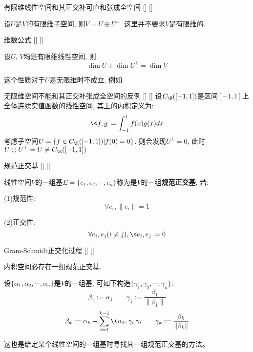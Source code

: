\documentclass[UTF8]{ctexart}
\begin{document}
		

        \begin{ppt}
            []
            {有限维线性空间和其正交补可直和张成全空间}
            []
            []
            
            设$U$是$V$的有限维子空间, 则$V=U\oplus U^{\perp}$. 这里并不要求$V$是有限维的.
        \end{ppt}
        
        \begin{ppt}
			[]
			{维数公式}
			[]
			[]
			
			设$U$, $V$均是有限维线性空间, 则
            \[\dim U+\dim U^{\perp}=\dim V\]
		\end{ppt}

        这个性质对于$U$是无限维时不成立, 例如
        \begin{cxmp}
            []
            {无限维空间不能和其正交补张成全空间的反例}
            []
            []
            设$C_{\R}([-1,1])$是区间$[-1,1]$上全体连续实值函数的线性空间, 
            其上的内积定义为:
            \[\<f,g\>=\int_{-1}^{1}f(x)g(x)dx\]
            考虑子空间$U=\{f\in C_{\R}([-1,1])| f(0)=0\}$. 则会发现$U^{\perp}={0}$, 此时$U\oplus U^{\perp}=U\neq C_{\R}([-1,1])$
        \end{cxmp}
        
		\begin{dfn}
			[]
			{规范正交基}
			[]
			[]

			线性空间$V$的一组基$E=\{e_1,e_2,\cdots,e_n\}$称为是$V$的一组\textbf{规范正交基}, 若: 

			(1)规范性: 
			\[\forall e_i, \|e_i\|=1\]

			(2)正交性: 
			\[\forall e_i,e_j(i\neq j), \<e_i,e_j\>=0\]
		\end{dfn}
		
		\begin{thm}
			[]
			{Gram-Schmidt正交化过程}
			[]
			[]

			内积空间必存在一组规范正交基. 
		\end{thm}
		
		\begin{prf}
			设$\{\alpha_1,\alpha_2,\cdots,\alpha_n\}$是$V$的一组基, 可如下构造$\{\gamma_1,\gamma_2,\cdots,\gamma_n\}$: 
			\[\beta_1:=\alpha_1\qquad\gamma_1:=\frac{\beta_1}{\|\beta_1\|}\]
			\[\beta_k:=\alpha_k-\sum_{i=1}^{k-1}\<\alpha_k,\gamma_i\>\gamma_i\qquad\gamma_k:=\frac{\beta_k}{\|\beta_k\|}\]
		\end{prf}
		
		这也是给定某个线性空间的一组基时寻找其一组规范正交基的方法。
\end{document}
